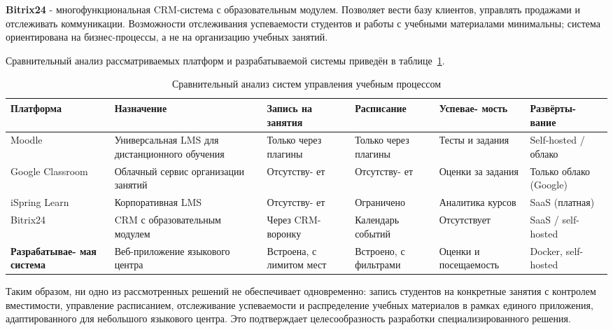 \textbf{Bitrix24} - многофункциональная CRM-система с образовательным модулем.
Позволяет вести базу клиентов, управлять продажами и отслеживать коммуникации.
Возможности отслеживания успеваемости студентов и работы с учебными материалами
минимальны; система ориентирована на бизнес-процессы, а не на организацию
учебных занятий.

Сравнительный анализ рассматриваемых платформ и разрабатываемой системы приведён
в таблице~\ref{tab:competitors}.

\begin{table}[ht!]
    \centering
    \caption{Сравнительный анализ систем управления учебным процессом}
    \label{tab:competitors}
    \small
    \begin{tabularx}{\textwidth}{|p{2.6cm}|X|p{1.7cm}|p{1.9cm}|p{2.0cm}|p{1.8cm}|}
        \hline
        \textbf{Платформа} &
        \textbf{Назначение} &
        \textbf{Запись на занятия} &
        \textbf{Расписание} &
        \textbf{Успевае- мость} &
        \textbf{Развёрты- вание} \\ \hline
        Moodle &
        Универсальная LMS для дистанционного обучения &
        Только через плагины &
        Только через плагины &
        Тесты и задания &
        Self-hosted / облако \\ \hline
        Google Classroom &
        Облачный сервис организации занятий &
        Отсутству- ет &
        Отсутству- ет &
        Оценки за задания &
        Только облако (Google) \\ \hline
        iSpring Learn &
        Корпоративная LMS &
        Отсутству- ет &
        Ограничено &
        Аналитика курсов &
        SaaS (платная) \\ \hline
        Bitrix24 &
        CRM с образовательным модулем &
        Через CRM-воронку &
        Календарь событий &
        Отсутствует &
        SaaS / self-hosted \\ \hline
        \textbf{Разрабатывае- мая система} &
        Веб-приложение языкового центра &
        Встроена, с лимитом мест &
        Встроено, с фильтрами &
        Оценки и посещаемость &
        Docker, self-hosted \\ \hline
    \end{tabularx}
\end{table}

Таким образом, ни одно из рассмотренных решений не обеспечивает одновременно:
запись студентов на конкретные занятия с контролем вместимости, управление
расписанием, отслеживание успеваемости и распределение учебных материалов в
рамках единого приложения, адаптированного для небольшого языкового центра.
Это подтверждает целесообразность разработки специализированного решения.

